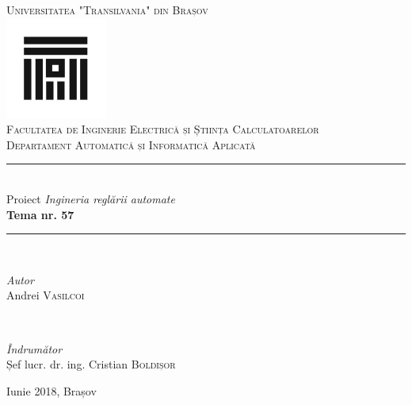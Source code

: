 \documentclass{article}
\author{Andrei Vasilcoi}
\begin{document}
\begin{titlepage}

\newcommand{\HRule}{\rule{\linewidth}{0.5mm}}
	
\begin{center}
\textsc{\LARGE Universitatea "Transilvania" din Brașov}\\[0.5cm]
\includegraphics[width=0.25\textwidth]{logo_ut.jpg}\\[0.5cm]
\textsc{\Large Facultatea de Inginerie Electrică și Știința Calculatoarelor}\\[0.5cm]
\textsc{\large Departament Automatică și Informatică Aplicată}\\[1.5cm]
\HRule\\[0.5cm]
{\Large Proiect \textit{Ingineria reglării automate}}\\[0.5cm]
{\LARGE\bfseries Tema nr. 57}\\[0.5cm]
\HRule\\[1.5cm]
	
\begin{minipage}{0.4\textwidth}
	\begin{flushleft}
		\large
		\textit{Autor}\\
		Andrei \textsc{Vasilcoi}\\
	\end{flushleft}
\end{minipage}
~
\begin{minipage}{0.4\textwidth}
	\begin{flushright}
		\large
		\textit{Îndrumător}\\
	Șef lucr. dr. ing. Cristian \textsc{Boldișor}
	\end{flushright}
\end{minipage}
\vfill
{\large Iunie 2018, Brașov}\\[1cm]
\end{center}
\end{titlepage}

\newpage
{}
\tableofcontents

\newpage	
\end{document}
